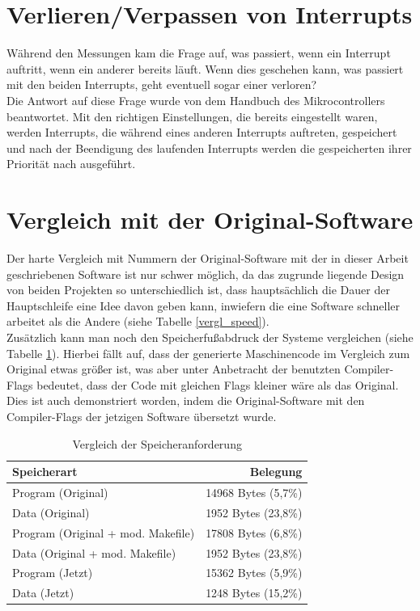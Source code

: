 \section{Verlieren/Verpassen von Interrupts}
Während den Messungen kam die Frage auf, was passiert, wenn ein Interrupt auftritt, wenn ein anderer bereits läuft.
Wenn dies geschehen kann, was passiert mit den beiden Interrupts, geht eventuell sogar einer verloren?\\
Die Antwort auf diese Frage wurde von dem Handbuch des Mikrocontrollers \cite{ATMEGA_MANUAL} beantwortet. Mit
den richtigen Einstellungen, die bereits eingestellt waren, werden Interrupts, die während eines anderen
Interrupts auftreten, gespeichert und nach der Beendigung des laufenden Interrupts werden die gespeicherten
ihrer Priorität nach ausgeführt.
\section{Vergleich mit der Original-Software}
Der harte Vergleich mit Nummern der Original-Software mit der in dieser Arbeit geschriebenen Software ist
nur schwer möglich, da das zugrunde liegende Design von beiden Projekten so unterschiedlich ist, dass hauptsächlich
die Dauer der Hauptschleife eine Idee davon geben kann, inwiefern die eine Software schneller arbeitet als die Andere
(siehe Tabelle \ref{vergl_speed}).\\
Zusätzlich kann man noch den Speicherfußabdruck der Systeme vergleichen (siehe Tabelle \ref{vergl_speicher}). Hierbei
fällt auf, dass der generierte Maschinencode im Vergleich zum Original etwas größer ist, was aber unter Anbetracht
der benutzten Compiler-Flags bedeutet, dass der Code mit gleichen Flags kleiner wäre als das Original. Dies ist
auch demonstriert worden, indem die Original-Software mit den Compiler-Flags der jetzigen Software übersetzt
wurde.
\begin{table}[htb]
\begin{center}
	\begin{tabular}{|l||r|}
		\hline
		\textbf{Speicherart} & \textbf{Belegung} \\ \hline \hline
		Program (Original) & 14968 Bytes (5,7\%)  \\ \hline
		Data (Original)& 1952 Bytes (23,8\%) \\ \hline \hline
		Program (Original + mod. Makefile) & 17808 Bytes (6,8\%)  \\ \hline
		Data (Original + mod. Makefile) & 1952 Bytes (23,8\%) \\ \hline \hline
		Program (Jetzt)& 15362 Bytes (5,9\%) \\ \hline
		Data (Jetzt)& 1248 Bytes (15,2\%) \\ \hline
	\end{tabular}
	\caption{\label{vergl_speicher} Vergleich der Speicheranforderung}
\end{center}
\end{table}
